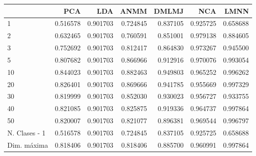 \begin{tabular}{lrrrrrr}
\toprule
{} &       PCA &       LDA &      ANMM &     DMLMJ &       NCA &      LMNN \\
\midrule
1             &  0.516578 &  0.901703 &  0.724845 &  0.837105 &  0.925725 &  0.658688 \\
2             &  0.632465 &  0.901703 &  0.760591 &  0.851001 &  0.979138 &  0.884605 \\
3             &  0.752692 &  0.901703 &  0.812417 &  0.864830 &  0.973267 &  0.945500 \\
5             &  0.807682 &  0.901703 &  0.866966 &  0.912916 &  0.970076 &  0.993054 \\
10            &  0.844023 &  0.901703 &  0.882463 &  0.949803 &  0.965252 &  0.996262 \\
20            &  0.826401 &  0.901703 &  0.869666 &  0.941785 &  0.955669 &  0.997329 \\
30            &  0.819999 &  0.901703 &  0.852030 &  0.930023 &  0.956727 &  0.933755 \\
40            &  0.821085 &  0.901703 &  0.825875 &  0.919336 &  0.964737 &  0.997864 \\
50            &  0.820007 &  0.901703 &  0.821077 &  0.896381 &  0.969544 &  0.996797 \\
N. Clases - 1 &  0.516578 &  0.901703 &  0.724845 &  0.837105 &  0.925725 &  0.658688 \\
Dim. máxima   &  0.818406 &  0.901703 &  0.818406 &  0.885700 &  0.960991 &  0.997864 \\
\bottomrule
\end{tabular}

